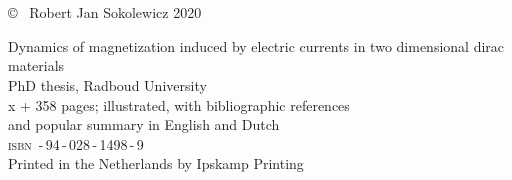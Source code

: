 \frenchspacing
\raggedbottom

\thispagestyle{empty}
\vspace*{4em}
\begin{center}
\huge{}\\
\huge{}\\
\end{center}
\newpage

\thispagestyle{empty}
\null
\vfill

\setlength{\marginparwidth}{2em}
\setlength{\marginparsep}{0.75em}

\noindent \copyright~ Robert Jan Sokolewicz 2020


\noindent Dynamics of magnetization induced by electric currents in two dimensional dirac materials\\
PhD thesis, Radboud University\\
x + 358 pages; illustrated, with bibliographic references \\ and popular summary in English and Dutch\\[2ex]
{\scshape isbn} \,-\,94\,-\,028\,-\,1498\,-\,9\\[2ex]
Printed in the Netherlands by Ipskamp Printing\\[2ex]


